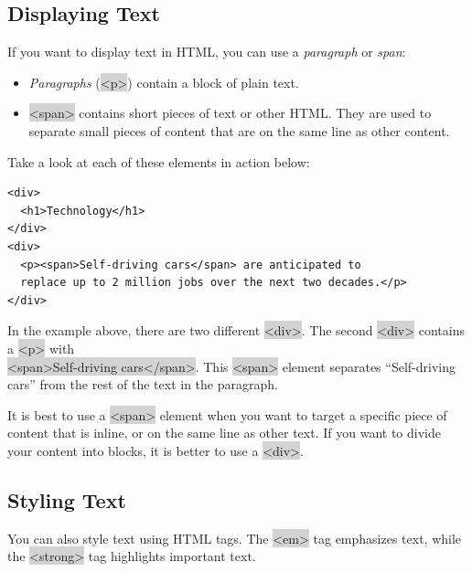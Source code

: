 \documentclass[11pt]{article}
\begin{document}
\subsection{Displaying Text}
If you want to display text in HTML, you can use a \textit{paragraph} or \textit{span}:
\begin{itemize}[leftmargin = *]
\item \textit{Paragraphs} (\colorbox{lightgray}{<p>}) contain a block of plain text.
\item \colorbox{lightgray}{<span>} contains short pieces of text or other HTML. They are used to separate small pieces of content that are on the same line as other content.
\end{itemize}
Take a look at each of these elements in action below:
\begin{lstlisting}
<div>
  <h1>Technology</h1>
</div>
<div>
  <p><span>Self-driving cars</span> are anticipated to 
  replace up to 2 million jobs over the next two decades.</p>
</div>
\end{lstlisting}
In the example above, there are two different \colorbox{lightgray}{<div>}. The second \colorbox{lightgray}{<div>} contains a \colorbox{lightgray}{<p>} with \\
\colorbox{lightgray}{<span>Self-driving cars</span>}. This \colorbox{lightgray}{<span>} element separates “Self-driving cars” from the rest of the text in the paragraph.

It is best to use a \colorbox{lightgray}{<span>} element when you want to target a specific piece of content that is inline, or on the same line as other text. If you want to divide your content into blocks, it is better to use a \colorbox{lightgray}{<div>}.

\subsection{Styling Text}
You can also style text using HTML tags. The \colorbox{lightgray}{<em>} tag emphasizes text, while the \colorbox{lightgray}{<strong>} tag highlights important text.
\end{document}
